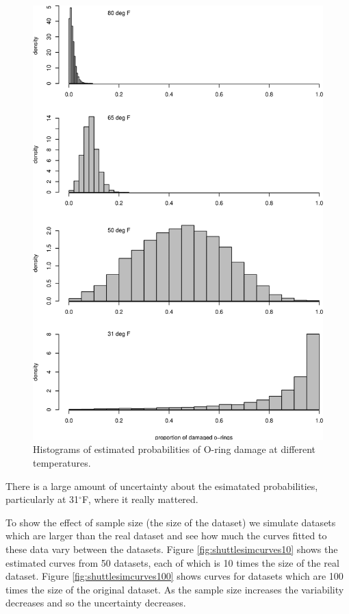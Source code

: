 \documentclass[
  11pt,
  british,
  openany, a4paper]{book}
\begin{document}
\begin{figure}

{\centering \includegraphics[width=0.75\linewidth]{images/shuttle_sim} 

}

\caption{Histograms of estimated probabilities of O-ring damage at different temperatures.}\label{fig:shuttlesim}
\end{figure}

There is a large amount of uncertainty about the esimatated probabilities, particularly at 31\(^\circ\)F, where it really mattered.

To show the effect of sample size (the size of the dataset) we simulate datasets which are larger than the real dataset and see how much the curves fitted to these data vary between the datasets. Figure \ref{fig:shuttlesimcurves10} shows the estimated curves from 50 datasets, each of which is 10 times the size of the real dataset. Figure \ref{fig:shuttlesimcurves100} shows curves for datasets which are 100 times the size of the original dataset. As the sample size increases the variability decreases and so the uncertainty decreases.
\end{document}
